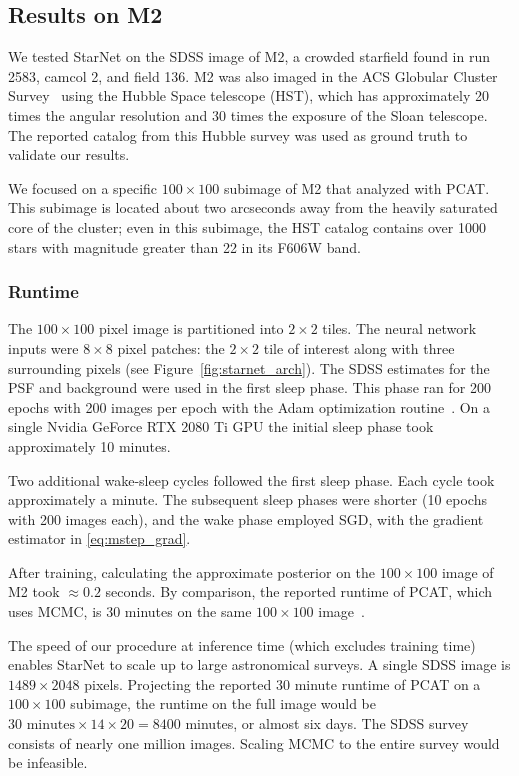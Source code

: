 \subsection{Results on M2}
\label{sec:results_on_m2}
We tested StarNet on the SDSS image of M2, a crowded starfield found in run 2583, camcol 2, and field 136.
M2 was also imaged in the ACS Globular Cluster Survey~\cite{Sarajedini_2007}
using the Hubble Space telescope (HST),
which has approximately 20 times the angular resolution and 30 times the exposure of the Sloan telescope. The reported catalog from this Hubble survey was used as ground truth to 
validate our results.

We focused on a specific $100 \times 100$ subimage of M2 that \cite{Portillo_2017, Feder_2019} analyzed with PCAT.
This subimage is located about two arcseconds away from the heavily saturated core of the cluster;
even in this subimage, the HST catalog contains over 1000 stars with magnitude greater than 22 in its F606W band.

\subsubsection{Runtime} 
\label{sec:runtime}
The $100 \times 100$ pixel image is partitioned into $2\times 2$ tiles. 
The neural network inputs were $8\times8$ pixel patches: 
the $2\times 2$ tile of interest along with three surrounding pixels (see Figure~\ref{fig:starnet_arch}). 
The SDSS estimates for the PSF and background were used in the first sleep phase. 
This phase ran for 200 epochs with 200 images per epoch with  
the Adam optimization routine~\cite{kingma2014adam}. 
On a single Nvidia GeForce RTX 2080 Ti GPU 
the initial sleep phase took approximately 10 minutes. 

Two additional wake-sleep cycles followed the first sleep phase. 
Each cycle took approximately a minute. The subsequent sleep phases were shorter (10 epochs with 200 images each), and the wake phase employed SGD, with the gradient estimator in \eqref{eq:mstep_grad}.

After training, calculating the approximate posterior on the $100 \times 100$ image of M2 took $\approx 0.2$ seconds. 
By comparison, the reported runtime of PCAT, which uses MCMC, is 30 minutes on the same $100 \times 100$ image~\cite{Feder_2019}. 

The speed of our procedure at inference time (which excludes training time) enables StarNet to scale up to large astronomical surveys. A single SDSS image is $1489 \times 2048$ pixels. Projecting the reported 30 minute runtime of PCAT on a $100\times100$ subimage, 
the runtime on the full image would be $30\text{ minutes} \times 14 \times 20 = 8400$ minutes, or almost six days. The SDSS survey consists of nearly one million images. Scaling MCMC to the entire survey would be infeasible. 

